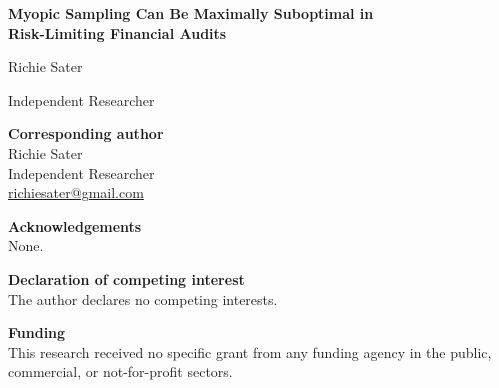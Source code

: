 \documentclass[11pt]{article}
\begin{document}
\begin{center}
{\LARGE\bfseries Myopic Sampling Can Be Maximally Suboptimal in\\[0.3em]
Risk-Limiting Financial Audits\par}
\vspace{1.5em}
{\large Richie Sater\par}
\vspace{0.35em}
Independent Researcher
\end{center}

\vspace{2em}
\noindent\textbf{Corresponding author}\\
Richie Sater\\
Independent Researcher\\
\href{mailto:richiesater@gmail.com}{richiesater@gmail.com}

\vspace{1.25em}
\noindent\textbf{Acknowledgements}\\
None.

\vspace{1.25em}
\noindent\textbf{Declaration of competing interest}\\
The author declares no competing interests.

\vspace{1.25em}
\noindent\textbf{Funding}\\
This research received no specific grant from any funding agency in the public,
commercial, or not-for-profit sectors.
\end{document}
